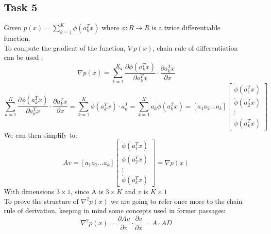 \subsection{Task 5}
Given $p(x) = \sum_{k=1}^{K} \phi(a_k^{T}x)$ where $ \phi : R\to R$ is a twice differentiable function.\\
To compute the gradient of the function, $\nabla{p(x)}$, chain rule of differentiation can be used :
\begin{equation}
 \nabla{p(x)}= \sum_{k=1}^{K} \frac{\partial \phi(a_k^{T}x)}{\partial a_k^{T}x} \cdot \frac{\partial a_k^{T}x}{\partial x}
\end{equation} 
\begin{equation}
\sum_{k=1}^{K} \frac{\partial \phi(a_k^{T}x)}{\partial a_k^{T}x} \cdot \frac{\partial a_k^{T}x}{\partial x} = \sum_{k=1}^{K}  \dot\phi(a_k^{T}x)\cdot a_k^{T} = \sum_{k=1}^{K} a_k\dot\phi(a_k^{T}x) = [a_1  a_2 \hdots a_k] \begin{bmatrix} \dot\phi(a_1^{T}x) \\
                                                           \dot\phi(a_2^{T}x) \\
                                                           \vdots \\
                                                           \dot\phi(a_k^{T}x)
                                                           \end{bmatrix}
\end{equation} 
We can then simplify to:
\begin{equation}
Av = [a_1  a_2 \hdots a_k] \begin{bmatrix} \dot\phi(a_1^{T}x) \\
                                                           \dot\phi(a_2^{T}x) \\
                                                           \vdots \\
                                                           \dot\phi(a_k^{T}x)
                                                           \end{bmatrix}= \nabla{p(x)}
\end{equation}
With dimensions $3\times1$, since A is $3\times K$ and $v$ is $K\times1$\\
To prove the structure of $\nabla^{2}{p(x)}$ we are going to refer once more to the chain rule of derivation, keeping in mind some concepts used in former passages:
\begin{equation}
\nabla^{2}{p(x)}= \frac{\partial Av}{\partial v} \cdot \frac{\partial v}{\partial x} = A \cdot AD%
\end{equation}
